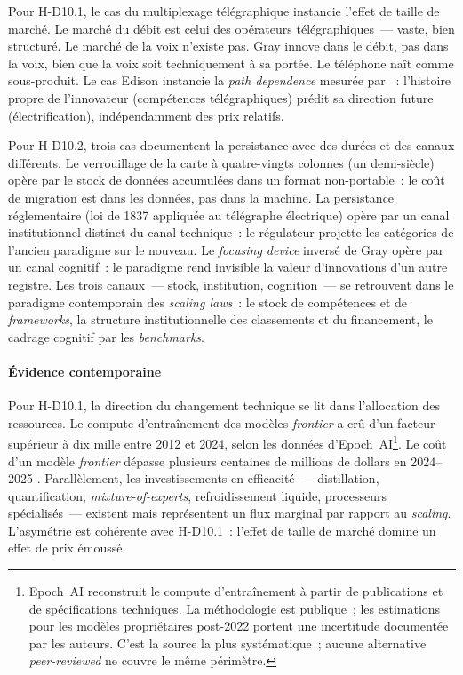 Pour H-D10.1, le cas du multiplexage télégraphique instancie l'effet de taille de marché. Le marché du débit est celui des opérateurs télégraphiques~--- vaste, bien structuré. Le marché de la voix n'existe pas. Gray innove dans le débit, pas dans la voix, bien que la voix soit techniquement à sa portée. Le téléphone naît comme sous-produit. Le cas Edison instancie la \emph{path dependence} mesurée par \textcite{aghion_carbon_2016}~: l'histoire propre de l'innovateur (compétences télégraphiques) prédit sa direction future (électrification), indépendamment des prix relatifs.

Pour H-D10.2, trois cas documentent la persistance avec des durées et des canaux différents. Le verrouillage de la carte à quatre-vingts colonnes (un demi-siècle) opère par le stock de données accumulées dans un format non-portable~: le coût de migration est dans les données, pas dans la machine. La persistance réglementaire (loi de 1837 appliquée au télégraphe électrique) opère par un canal institutionnel distinct du canal technique~: le régulateur projette les catégories de l'ancien paradigme sur le nouveau. Le \emph{focusing device} inversé de Gray opère par un canal cognitif~: le paradigme rend invisible la valeur d'innovations d'un autre registre. Les trois canaux~--- stock, institution, cognition~--- se retrouvent dans le paradigme contemporain des \emph{scaling laws}~: le stock de compétences et de \emph{frameworks}, la structure institutionnelle des classements et du financement, le cadrage cognitif par les \emph{benchmarks}.


\paragraph{Évidence contemporaine}

Pour H-D10.1, la direction du changement technique se lit dans l'allocation des ressources. Le compute d'entraînement des modèles \emph{frontier} a crû d'un facteur supérieur à dix mille entre 2012 et 2024, selon les données d'Epoch~AI\footnote{Epoch~AI reconstruit le compute d'entraînement à partir de publications et de spécifications techniques. La méthodologie est publique~; les estimations pour les modèles propriétaires post-2022 portent une incertitude documentée par les auteurs. C'est la source la plus systématique~; aucune alternative \emph{peer-reviewed} ne couvre le même périmètre.}. Le coût d'un modèle \emph{frontier} dépasse plusieurs centaines de millions de dollars en 2024--2025 \parencite{cottier_rising_2025}. Parallèlement, les investissements en efficacité~--- distillation, quantification, \emph{mixture-of-experts}, refroidissement liquide, processeurs spécialisés~--- existent mais représentent un flux marginal par rapport au \emph{scaling}. L'asymétrie est cohérente avec H-D10.1~: l'effet de taille de marché domine un effet de prix émoussé.

